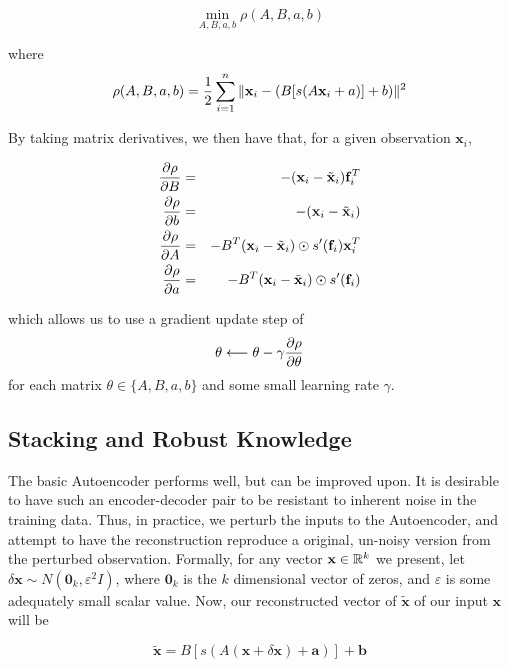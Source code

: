 \begin{equation}
\min_{A,B,a,b} \rho(A,B,a,b)
\end{equation}

where 
\begin{equation}
\label{eqrho}
\rho(A,B,a,b) = \frac{1}{2}\sum_{i = 1}^{n} \Vert \mathbf{x}_i -  (B [s(A\mathbf{x}_i + a)]+b) \Vert ^ 2
\end{equation}

By taking matrix derivatives, we then have that, for a given observation $\mathbf{x}_i$,

\begin{eqnarray}
\label{grads_of_auto}
\frac{\partial \rho}{\partial B}&=& -(\mathbf{x}_i -\tilde{\mathbf{x}}_i) \mathbf{f}_i^T \\ 
\frac{\partial \rho}{\partial b}&=& -(\mathbf{x}_i - \tilde{\mathbf{x}}_i) \\
\frac{\partial \rho}{\partial A}&=& -B^T(\mathbf{x}_i -\tilde{\mathbf{x}}_i) \odot s'(\mathbf{f}_i)\mathbf{x}_i^T \\
\frac{\partial \rho}{\partial a}&=& -B^T(\mathbf{x}_i -\tilde{\mathbf{x}}_i) \odot s'(\mathbf{f}_i)
\end{eqnarray}

which allows us to use a gradient update step of
\begin{equation}
\theta \longleftarrow \theta - \gamma \frac{\partial \rho}{\partial \theta}
\end{equation}
for each matrix $\theta\in\{A, B, a, b\}$ and some small learning rate $\gamma$.

\subsection{Stacking and Robust Knowledge}
The basic Autoencoder performs well, but can be improved upon. It is desirable to have such an encoder-decoder pair to be resistant to inherent noise in the training data. Thus, in practice, we perturb the inputs to the Autoencoder, and attempt to have the reconstruction reproduce a original, un-noisy version from the perturbed observation. Formally, for any vector $\textbf{x}\in\mathbb{R}^{k}$ we present, let $\delta\mathbf{x}\sim N(\mathbf{0}_k, \varepsilon^2 I)$, where $\mathbf{0}_k$ is the $k$ dimensional vector of zeros, and $\varepsilon$ is some adequately small scalar value. Now, our reconstructed vector of $\tilde{\mathbf{x}}$ of our input $\mathbf{x}$ will be 

\begin{equation}
\label{denoising}
\tilde{\mathbf{x}} = B[s(A(\mathbf{x} + \delta\mathbf{x}) + \mathbf{a})] + \mathbf{b}
\end{equation}

